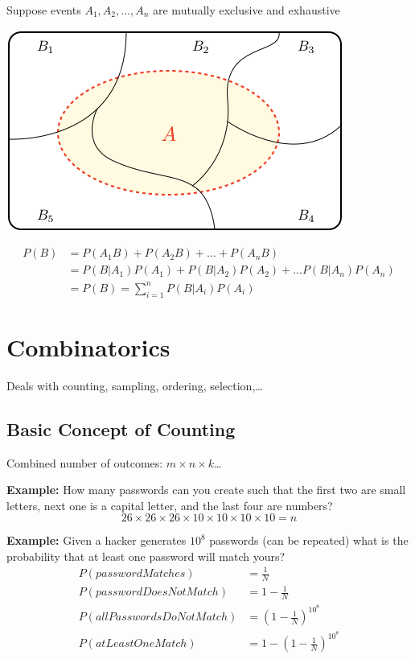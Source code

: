 \documentclass[12pt]{article}
\begin{document}
    Suppose events $A_1, A_2,\dots,A_n$ are mutually exclusive and 
    exhaustive
    
    \begin{center}
        \includegraphics[scale=0.5]{images/total_prob.png}
    \end{center}
    \begin{align*}
        P(B) &= P(A_1B) + P(A_2B) + ... + P(A_nB)\\
             &= P(B|A_1)P(A_1) + P(B|A_2)P(A_2) + ... P(B|A_n)P(A_n)\\
             &= P(B) =  \sum_{i=1}^{n} P(B|A_i)P(A_i)
    \end{align*}

    \section{Combinatorics}

    Deals with counting, sampling, ordering, selection,\dots

    \subsection{Basic Concept of Counting}

    Combined number of outcomes: $m \times n \times k$\dots

    \textbf{Example:} How many passwords can you create such that 
    the first two are small letters, next one is a capital letter, 
    and the last four are numbers?
    $$26\times 26\times 26\times 10\times 10\times 10\times 10 = n$$

    \textbf{Example:} Given a hacker generates $10^8$ passwords (can 
    be repeated) what is the probability that at least one password 
    will match yours?
    \begin{align*}
        P(passwordMatches) &= \frac{1}{N}\\
        P(passwordDoesNotMatch) &= 1 - \frac{1}{N}\\
        P(allPasswordsDoNotMatch) &= \left(1-\frac{1}{N}\right)^{10^8}\\
        P(atLeastOneMatch) &= 1 - \left(1-\frac{1}{N}\right)^{10^8}
    \end{align*}
\end{document}
